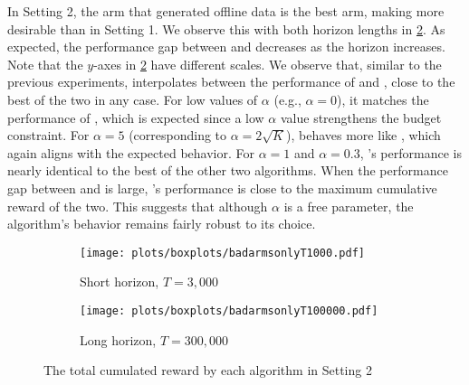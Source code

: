 In Setting 2, the arm that generated offline data is the best arm, making \alglcb more desirable than in Setting 1. We observe this with both horizon lengths in \cref{fig:summaryexprealdatabadarm}. As expected, the performance gap between \algucb and \alglcb decreases as the horizon increases. Note that the $y$-axes in \cref{fig:summaryexprealdatabadarm} have different scales.
We observe that, similar to the previous experiments, \algoname interpolates between the performance of \algucb and \alglcb, close to the best of the two in any case. For low values of $\alpha$ (e.g., $\alpha=0$), it matches the performance of \alglcb, which is expected since a low $\alpha$ value strengthens the budget constraint.  For $\alpha=5$ (corresponding to $\alpha = 2\sqrt{K}$), \algoname behaves more like \algucb, which again aligns with the expected behavior. For $\alpha=1$ and $\alpha=0.3$, \algoname's performance is nearly identical to the best of the other two algorithms. When the performance gap between \alglcb and \algucb is large, \algoname's performance is close to the maximum cumulative reward of the two. This suggests that although $\alpha$ is a free parameter, the algorithm's behavior remains fairly robust to its choice.

\begin{figure}[ht]
    \centering
    \begin{subfigure}[b]{0.8\textwidth}
        \centering
        \texttt{[image: plots/boxplots/badarmsonlyT1000.pdf]} %
        \caption{Short horizon, $T=3,000$}
        \label{fig:fiboxplotbadarmsonlyhorthorizon}
    \end{subfigure}
    \vspace{1cm} %
    \begin{subfigure}[b]{0.8\textwidth}
        \centering
        \texttt{[image: plots/boxplots/badarmsonlyT100000.pdf]} %
        \caption{Long horizon, $T=300,000$}
    \end{subfigure}
    \caption{The total cumulated reward by each algorithm in Setting 2}
    \label{fig:summaryexprealdatabadarm}
\end{figure}


